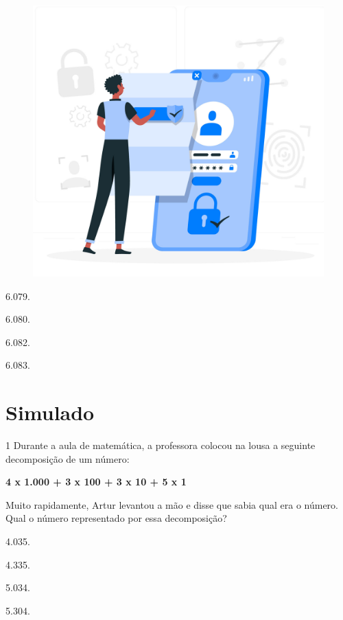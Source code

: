 \begin{figure}[htpb!]
\centering
\includegraphics[width=.8\textwidth]{./media/image107a.jpeg}
\end{figure}

\begin{escolha}
\item
  6.079.
\item
  6.080.
\item
  6.082.
\item
  6.083.
\end{escolha}

\chapter[Simulado 3]{Simulado}

\num{1} Durante a aula de matemática, a professora colocou na lousa a seguinte decomposição de um número:

\begin{myquote}
\centering
\textbf{4 x 1.000 + 3 x 100 + 3 x 10 + 5 x 1}
\end{myquote}

Muito rapidamente, Artur levantou a mão e disse que sabia qual era o número. Qual o número representado por essa decomposição?

\begin{multicols}{2}
\begin{escolha}
\item
  4.035.
\item
  4.335.
\item
  5.034.
\item
  5.304.
\end{escolha}
\end{multicols}

